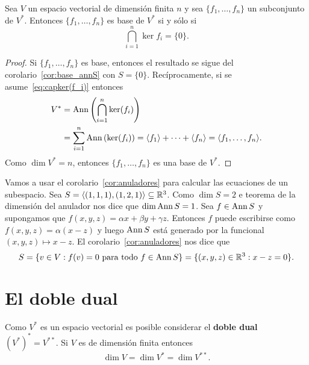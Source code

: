 \begin{cor}
    \label{cor:basis_of_V*}
	Sea $V$ un espacio vectorial de dimensión finita $n$ y sea
	$\{f_1,\dots,f_n\}$ un subconjunto de $V^*$. Entonces $\{f_1,\dots,f_n\}$
	es base de $V^*$ si y sólo si  
	\begin{equation}
		\label{eq:capker(f_i)}
		\bigcap_{i=1}^n\ker f_i=\{0\}.
	\end{equation}

	\begin{proof}
		Si $\{f_1,\dots,f_n\}$ es base, entonces el resultado se sigue del
		corolario~\ref{cor:base_annS} con $S=\{0\}$. 
		Recíprocamente, si se asume~\eqref{eq:capker(f_i)} entonces 
		\begin{align*}
			V^* &= \operatorname{Ann}\left(\bigcap_{i=1}^n\ker(f_i)\right)\\
			&=\sum_{i=1}^n \operatorname{Ann}\left(\ker(f_i)\right)=\langle f_1\rangle+\cdots+\langle f_n\rangle=\langle f_1,\dots,f_n\rangle.
		\end{align*}
		Como $\dim V^*=n$, entonces $\{f_1,\dots,f_n\}$ es una base de $V^*$.
	\end{proof}
\end{cor}

\begin{example}
	Vamos a usar el corolario~\ref{cor:anuladores} para calcular las ecuaciones
	de un subespacio. Sea $S=\langle(1,1,1),(1,2,1)\rangle\subseteq\mathbb{R}^3$. Como
	$\dim S=2$ e teorema de la dimensión del anulador nos dice que $\dim\operatorname{Ann}
	S=1$. Sea $f\in\operatorname{Ann} S$ y supongamos que $f(x,y,z)=\alpha x+\beta y+\gamma z$. Entonces
	$f$ puede escribirse como $f(x,y,z)=\alpha(x-z)$ y luego $\operatorname{Ann} S$ está
	generado por la funcional $(x,y,z)\mapsto x-z$. El corolario~\ref{cor:anuladores} nos dice
	que 
	\[
		S=\{v\in V:f(v)=0\text{ para todo $f\in\operatorname{Ann} S$}\}=\{(x,y,z)\in\mathbb{R}^3:x-z=0\}.
	\]
\end{example}

\section{El doble dual}

\begin{block}
    Como $V^*$ es un espacio vectorial es posible considerar el \textbf{doble
    dual} $\left(V^*\right)^*=V^{**}$. Si $V$ es de dimensión finita entonces
    \[
        \dim V=\dim V^*=\dim V^{**}.
    \]
\end{block}

